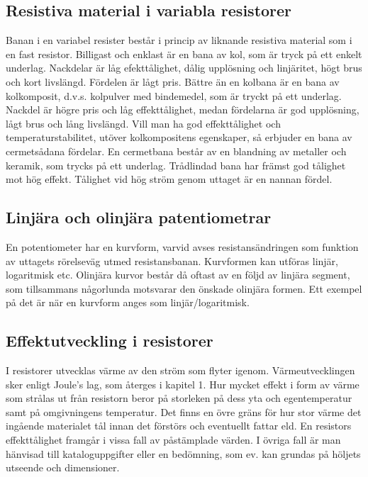 \subsection{Resistiva material i variabla resistorer}

Banan i en variabel resister består i princip av liknande resistiva material som i en fast
resistor. Billigast och enklast är en bana av kol, som är tryck på ett enkelt underlag.
Nackdelar är låg efekttålighet, dålig upplösning och
linjäritet, högt brus och kort livslängd. Fördelen är lågt pris.
Bättre än en kolbana är en bana av kolkomposit, d.v.s. kolpulver med bindemedel,
som är tryckt på ett underlag. Nackdel är högre pris och låg effekttålighet, medan
fördelarna är god upplösning, lågt brus och lång livslängd.
Vill man ha god effekttålighet och temperaturstabilitet, utöver kolkompositens egenskaper,
så erbjuder en bana av cermetsådana fördelar. En cermetbana består av en
blandning av metaller och keramik, som trycks på ett underlag.
Trådlindad bana har främst god tålighet mot hög effekt. Tålighet vid hög ström genom
uttaget är en nannan fördel.

\subsection{Linjära och olinjära patentiometrar}

En potentiometer har en kurvform, varvid avses resistansändringen som funktion av
uttagets rörelseväg utmed resistansbanan. Kurvformen kan utföras linjär, logaritmisk
etc. Olinjära kurvor består då oftast av en följd av linjära segment, som tillsammans
någorlunda motsvarar den önskade olinjära formen. Ett exempel på det är när en kurvform
anges som linjär/logaritmisk.

\subsection{Effektutveckling i resistorer}
I resistorer utvecklas värme av den ström som flyter igenom. Värmeutvecklingen sker
enligt Joule's lag, som återges i kapitel 1. Hur mycket effekt i form av värme som
strålas ut från resistorn beror på storleken på
dess yta och egentemperatur samt på omgivningens temperatur. Det finns en övre
gräns för hur stor värme det ingående materialet tål innan det förstörs och eventuellt
fattar eld. En resistors effekttålighet framgår i vissa fall av påstämplade värden.
I övriga fall är man hänvisad till kataloguppgifter eller en bedömning, som ev. kan
grundas på höljets utseende och dimensioner.

